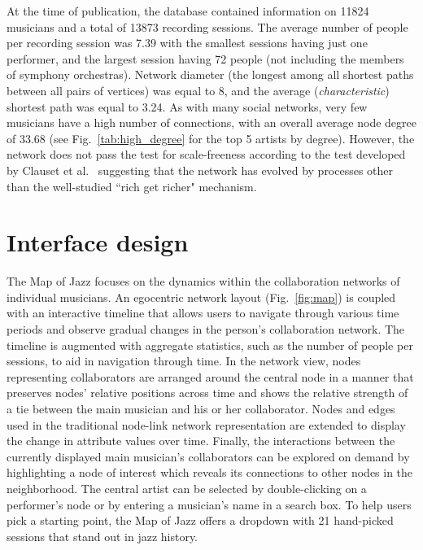\documentclass[12pt]{cmuthesis}
\begin{document}

  At the time of publication, the database contained information on 11824
  musicians and a total of 13873 recording sessions. The average number of people
  per recording session was 7.39 with the smallest sessions having just one
  performer, and the largest session having 72 people (not including the members of
  symphony orchestras). Network diameter (the longest among all shortest paths between all
  pairs of vertices) was equal to 8, and the average (\emph{characteristic})
  shortest path was equal to 3.24. As with many social networks, very few
  musicians have a high number of connections, with an overall average node degree
  of 33.68 (see Fig.~\ref{tab:high_degree} for the top 5 artists by degree).
  However, the network does not pass the test for scale-freeness according to the
  test developed by Clauset et al.~\cite{Clauset2009b} suggesting that the network
  has evolved by processes other than the well-studied ``rich get richer"
  mechanism.


\section{Interface design}
  The Map of Jazz focuses on the dynamics within the collaboration networks of
  individual musicians.
  An egocentric network layout (Fig.~\ref{fig:map})
  is coupled with an interactive timeline that allows
  users to navigate through various time periods and observe gradual changes in
  the person's collaboration network.
  The timeline is augmented with aggregate statistics, such as the number of
  people per sessions, to aid in navigation through time.
  In the network view,
  nodes representing collaborators are arranged around the central node in a
  manner that preserves nodes' relative positions across time and shows the
  relative strength of a tie between the main musician and his or her collaborator.
  Nodes and edges used in the traditional node-link network representation are
  extended to display the change in attribute values over time.
  Finally, the interactions between the currently displayed main musician's
  collaborators can be explored on demand by highlighting a node of interest which
  reveals its connections to other nodes in the neighborhood. The central
  artist can be selected by double-clicking on
  a performer's node or by entering a musician's name in a search box. To help
  users pick a starting point, the Map of Jazz offers a dropdown with 21
  hand-picked sessions that stand out in jazz history.
\end{document}

